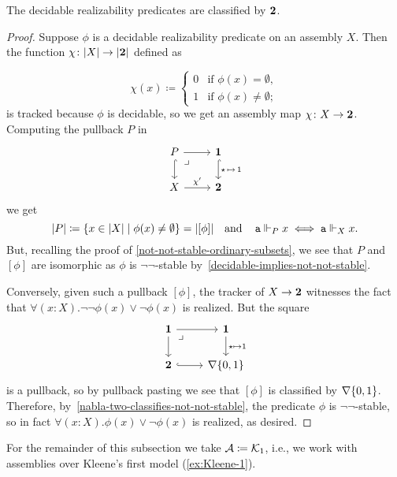 \begin{proposition}
  The decidable realizability predicates are classified by \(\mathbf 2\).
\end{proposition}
\begin{proof}
  Suppose \(\phi\) is a decidable realizability predicate on an assembly \(X\).
  Then the function \(\chi \colon \lvert X\rvert \to \lvert\mathbf 2\rvert\) defined as

  \[
    \chi(x) \coloneqq
    \begin{cases}
      0 &\text{if } \phi(x) = \emptyset, \\
          1 &\text{if } \phi(x) \neq \emptyset;
    \end{cases}
  \]
  is tracked because \(\phi\) is decidable, so we get an assembly map
  \(\chi \colon X \to \mathbf 2\).
  Computing the pullback \(P\) in
  \[
    \begin{tikzcd}
      P \ar[r] \ar[d,hookrightarrow] \pbcorner
      & \One \ar[d,hookrightarrow,"{\singleton \,\mapsto\, 1}"] \\
      X \ar[r,"\chi'"] & \Two
    \end{tikzcd}
  \]
  we get
  \[
    \lvert P\rvert \coloneqq \{x \in \lvert X\rvert \mid \phi(x) \neq \emptyset\}
    = \lvert[\phi]\rvert
    \quad\text{and}\quad
    \operatorname{\mathtt{a}} \Vdash_P x \iff \operatorname{\mathtt{a}} \Vdash_X x.
  \]
  But, recalling the proof of \cref{not-not-stable-ordinary-subsets}, we see
  that \(P\) and \([\phi]\) are isomorphic as \(\phi\) is \(\lnot\lnot\)-stable
  by~\cref{decidable-implies-not-not-stable}.

  Conversely, given such a pullback \([\phi]\), the tracker of \(X \to \mathbf 2\)
  witnesses the fact that \(\forall(x:X).\lnot\lnot\phi(x) \lor \lnot\phi(x)\)
  is realized.
  But the square
  \[
    \begin{tikzcd}
      \One \pbcorner \ar[r] \ar[d] & \One \ar[d,"\star \mapsto 1"] \\
      \Two \ar[r,hookrightarrow] & \nabla\set{0,1}
    \end{tikzcd}
  \]
  is a pullback, so by pullback pasting we see that \([\phi]\) is classified by
  \(\nabla\{0,1\}\). Therefore, by~\cref{nabla-two-classifies-not-not-stable},
  the predicate \(\phi\) is \(\lnot\lnot\)-stable, so in fact
  \(\forall(x:X).\phi(x) \lor \lnot\phi(x)\) is realized, as desired.
\end{proof}

For the remainder of this subsection we take \(\mathcal A \coloneqq \mathcal{K}_1\), i.e., we
work with assemblies over Kleene's first model (\cref{ex:Kleene-1}).

